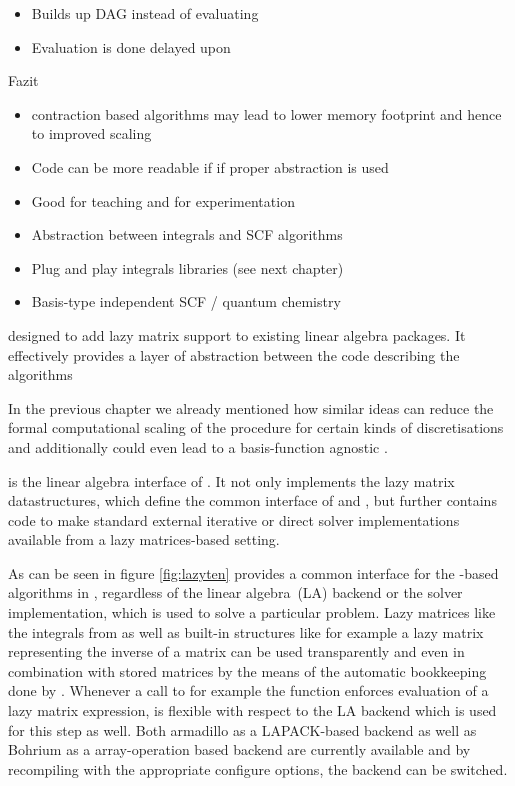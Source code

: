 \begin{itemize}
	\item Builds up DAG instead of evaluating
	\item Evaluation is done delayed upon \contraction
	
\end{itemize}

Fazit
\begin{itemize}
	\item contraction based algorithms may lead to lower memory footprint and
		hence to improved scaling
	\item Code can be more readable if if proper abstraction is used
	\item Good for teaching and for experimentation
	\item Abstraction between integrals and SCF algorithms
	\item Plug and play integrals libraries (see next chapter)
	\item Basis-type independent SCF / quantum chemistry
\end{itemize}


designed to add lazy matrix support to existing
linear algebra packages.
It effectively provides a layer of abstraction between the code
describing the algorithms


In the previous chapter we already mentioned
how similar ideas can reduce the formal
computational scaling of the \SCF procedure
for certain kinds of discretisations
and additionally could even lead to a basis-function
agnostic \SCF.



\lazyten is the linear algebra interface of \molsturm.
It not only implements the lazy matrix datastructures,
which define the common interface of \gint and \gscf,
but further contains code to make standard external
iterative or direct solver implementations available
from a lazy matrices-based setting.

As can be seen in figure \ref{fig:lazyten} \lazyten provides
a common interface for the \contraction-based algorithms in \gscf,
regardless of the linear algebra~(LA) backend or the solver implementation,
which is used to solve a particular problem.
Lazy matrices like the integrals from \gint as well as built-in structures
like for example a lazy matrix representing the inverse of a matrix
can be used transparently and even in combination with stored matrices
by the means of the automatic bookkeeping done by \lazyten.
Whenever a call to for example the \contraction function enforces
evaluation of a lazy matrix expression,
\lazyten is flexible with respect to the LA backend which is used for
this step as well.
Both armadillo as a LAPACK-based backend as well as Bohrium as a array-operation based backend
are currently available and by recompiling \molsturm with the appropriate configure options,
the backend can be switched.

